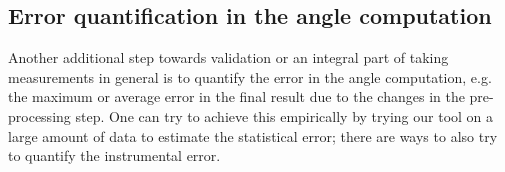 %
%




\subsection{Error quantification in the angle computation}

Another additional step towards validation or an integral part of taking measurements in general %
is to quantify the error in the angle computation, e.g. the maximum or average error in the final result due to the changes in the pre-processing step. %
One can try to achieve this empirically by trying our tool on a large amount of data to estimate the statistical error; there are ways to also try to quantify the instrumental error. 


%



